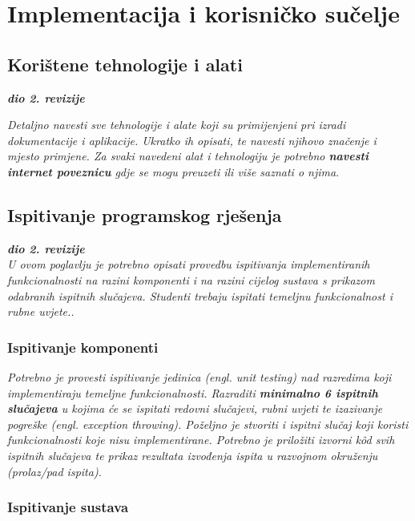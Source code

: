 \chapter{Implementacija i korisničko sučelje}
		
		
		\section{Korištene tehnologije i alati}
		
			\textbf{\textit{dio 2. revizije}}
			
			 \textit{Detaljno navesti sve tehnologije i alate koji su primijenjeni pri izradi dokumentacije i aplikacije. Ukratko ih opisati, te navesti njihovo značenje i mjesto primjene. Za svaki navedeni alat i tehnologiju je potrebno \textbf{navesti internet poveznicu} gdje se mogu preuzeti ili više saznati o njima}.
			
			
			\eject 
		
	
		\section{Ispitivanje programskog rješenja}
			
			\textbf{\textit{dio 2. revizije}}\\
			
			 \textit{U ovom poglavlju je potrebno opisati provedbu ispitivanja implementiranih funkcionalnosti na razini komponenti i na razini cijelog sustava s prikazom odabranih ispitnih slučajeva. Studenti trebaju ispitati temeljnu funkcionalnost i rubne uvjete..}
	
			
			\subsection{Ispitivanje komponenti}
			\textit{Potrebno je provesti ispitivanje jedinica (engl. unit testing) nad razredima koji implementiraju temeljne funkcionalnosti. Razraditi \textbf{minimalno 6 ispitnih slučajeva} u kojima će se ispitati redovni slučajevi, rubni uvjeti te izazivanje pogreške (engl. exception throwing). Poželjno je stvoriti i ispitni slučaj koji koristi funkcionalnosti koje nisu implementirane. Potrebno je priložiti izvorni kôd svih ispitnih slučajeva te prikaz rezultata izvođenja ispita u razvojnom okruženju (prolaz/pad ispita). }
			
			
			
			\subsection{Ispitivanje sustava}
			
